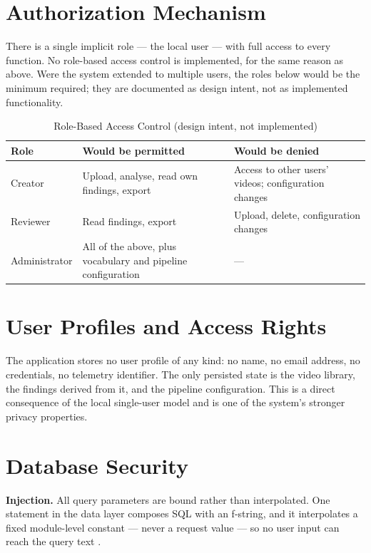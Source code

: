 \documentclass[
12pt,
a4paper,
oneside
]{report}
\begin{document}
\section{Authorization Mechanism}

There is a single implicit role --- the local user --- with full access to every
function. No role-based access control is implemented, for the same reason as
above. Were the system extended to multiple users, the roles below would be the
minimum required; they are documented as design intent, not as implemented
functionality.

\begin{table}[H]
\centering
\begin{tabular}{|p{3cm}|p{4.5cm}|p{4.5cm}|}
\hline
\textbf{Role} & \textbf{Would be permitted} & \textbf{Would be denied} \\
\hline
Creator & Upload, analyse, read own findings, export & Access to other users'
videos; configuration changes \\
\hline
Reviewer & Read findings, export & Upload, delete, configuration changes \\
\hline
Administrator & All of the above, plus vocabulary and pipeline configuration &
--- \\
\hline
\end{tabular}
\caption{Role-Based Access Control (design intent, not implemented)}
\end{table}

\section{User Profiles and Access Rights}

The application stores no user profile of any kind: no name, no email address,
no credentials, no telemetry identifier. The only persisted state is the video
library, the findings derived from it, and the pipeline configuration. This is a
direct consequence of the local single-user model and is one of the system's
stronger privacy properties.

\section{Database Security}

\textbf{Injection.} All query parameters are bound rather than interpolated. One
statement in the data layer composes SQL with an f-string, and it interpolates a
fixed module-level constant --- never a request value --- so no user input can
reach the query text \cite{OWASPTop10}.
\end{document}
